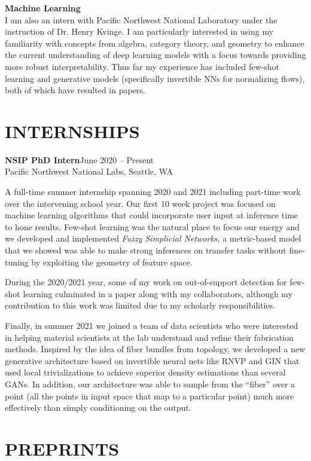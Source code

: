 \documentclass[margin]{res} %
\begin{document}
\begin{resume}
\textbf{Machine Learning}\\
I am also an intern with Pacific Northwest National Laboratory under the instruction of Dr. Henry Kvinge. 
I am particularly interested in using my familiarity with concepts from algebra, category theory, and geometry
to enhance the current understanding of deep learning models with a focus towards providing more robust interpretability.
Thus far my experience has included few-shot learning and generative models (specifically invertible NNs for normalizing flows), both of 
which have resulted in papers.

\section{INTERNSHIPS}
\textbf{NSIP PhD Intern}\hfill June 2020 -- Present\\
Pacific Northwest National Labs, Seattle, WA

A full-time summer internship spanning 2020 and 2021 including part-time work over the intervening school year. Our first 10 week project was focused on machine learning algorithms that could incorporate user input at inference time to hone results. Few-shot learning was the natural place to focus our energy and we developed and implemented \textit{Fuzzy Simplicial Networks}, a metric-based model that we showed was able to make strong inferences on transfer tasks without fine-tuning by exploiting the geometry of feature space.

During the 2020/2021 year, some of my work on out-of-support detection for few-shot learning culminated in a paper along with my collaborators, although my contribution to this work was limited due to my scholarly responsibilities.

Finally, in summer 2021 we joined a team of data scientists who were interested in helping material scientists at the lab understand and refine their fabrication methods. Inspired by the idea of fiber bundles from topology, we developed a new generative architecture based on invertible neural nets like RNVP and GIN that used local trivializations to achieve superior density estimations than several GANs. In addition, our architecture was able to sample from the ``fiber'' over a point (all the points in input space that map to a particular point) much more effectively than simply conditioning on the output.

\section{PREPRINTS}


\end{resume}
\end{document}
